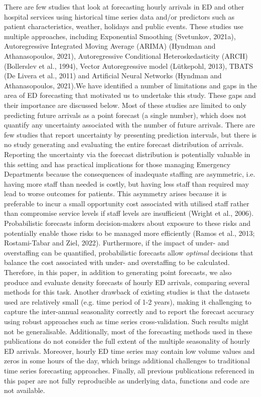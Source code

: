 \documentclass[]{elsarticle} %
\begin{document}
There are few studies that look at forecasting hourly arrivals in ED and
other hospital services using historical time series data and/or
predictors such as patient characteristics, weather, holidays and public
events. These studies use multiple approaches, including Exponential
Smoothing (Svetunkov, 2021a), Autoregressive Integrated Moving Average
(ARIMA) (Hyndman and Athanasopoulos, 2021), Autoregressive Conditional
Heteroskedasticity (ARCH) (Bollerslev et al., 1994), Vector Autoregressive
model (Lütkepohl, 2013), TBATS (De Livera et al., 2011) and Artificial
Neural Networks (Hyndman and Athanasopoulos, 2021).We have identified a number of limitations and gaps in the area of ED forecasting that motivated us to undertake this study. These gaps and their importance are discussed below. Most of these studies are limited to only predicting future arrivals as a point
forecast (a single number), which does not quantify any uncertainty associated with the number of future arrivals. There are few studies that report uncertainty by presenting prediction intervals, but there is no study generating and evaluating the entire forecast distribution of arrivals. Reporting the uncertainty via the forecast distribution is potentially valuable in this setting and has practical implications for those managing Emergency Departments because the consequences of inadequate staffing are asymmetric, i.e. having more staff than needed is costly, but
having less staff than required may lead to worse outcomes for patients. This asymmetry arises because it is preferable to incur a small opportunity cost associated with utilised staff rather than compromise service levels if staff levels are insufficient (Wright et al., 2006). Probabilistic forecasts inform decision-makers about exposure to these risks and potentially enable those risks to be managed more efficiently (Ramos et al., 2013; Rostami-Tabar and Ziel, 2022). Furthermore, if the impact of under- and overstaffing can be quantified,
probabilistic forecasts allow \emph{optimal} decisions that balance the cost associated with under- and overstaffing to be calculated. Therefore, in this paper, in addition to generating point forecasts, we also produce and evaluate density forecasts of hourly ED arrivals, comparing several methods for this task. Another drawback of existing studies is that the datasets used are relatively small (e.g. time period of 1-2 years), making it challenging to capture the inter-annual seasonality correctly and to report the forecast accuracy using robust approaches such as time series cross-validation. Such results might not be generalisable. Additionally, most of the forecasting methods used in these publications do not consider the full extent of the multiple seasonality of hourly ED arrivals. Moreover, hourly ED time series may contain low volume values and zeros in some hours of the day, which brings additional challenges to traditional time series forecasting approaches. Finally, all previous publications referenced in this paper are not fully reproducible as underlying data, functions and code are not available.
\end{document}

